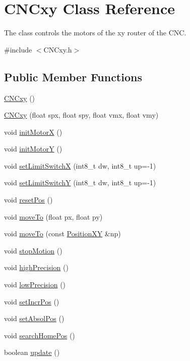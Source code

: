 \hypertarget{class_c_n_cxy}{\section{C\+N\+Cxy Class Reference}
\label{class_c_n_cxy}
}


The class controls the motors of the xy router of the C\+N\+C.  




{\ttfamily \#include $<$C\+N\+Cxy.\+h$>$}

\subsection*{Public Member Functions}
\begin{DoxyCompactItemize}
\item 
\hyperlink{class_c_n_cxy_a00b982f5e1cdf7d14e2b812fe634381a}{C\+N\+Cxy} ()
\item 
\hyperlink{class_c_n_cxy_adf2aa57e924162dcd02728eca3ce6ad4}{C\+N\+Cxy} (float spx, float spy, float vmx, float vmy)
\item 
void \hyperlink{class_c_n_cxy_a385a87e56ea216c855b4d2df37da987b}{init\+Motor\+X} ()
\item 
void \hyperlink{class_c_n_cxy_ab580bbe83bb4af2e9cfceb7409804a5f}{init\+Motor\+Y} ()
\item 
void \hyperlink{class_c_n_cxy_a32366595a9f719290e51bced4c50aef5}{set\+Limit\+Switch\+X} (int8\+\_\+t dw, int8\+\_\+t up=-\/1)
\item 
void \hyperlink{class_c_n_cxy_a0cb32c93e873b72091d8fadd8d6f00ca}{set\+Limit\+Switch\+Y} (int8\+\_\+t dw, int8\+\_\+t up=-\/1)
\item 
void \hyperlink{class_c_n_cxy_a2a0b5a7d65b3391a8e7e372aea2f670b}{reset\+Pos} ()
\item 
void \hyperlink{class_c_n_cxy_aeb30f9045a768b51b12521d032410631}{move\+To} (float px, float py)
\item 
void \hyperlink{class_c_n_cxy_a50739c5a639e2df4490725cb4893fe0d}{move\+To} (const \hyperlink{class_position_x_y}{Position\+X\+Y} \&np)
\item 
void \hyperlink{class_c_n_cxy_a1a20b3274b2cfcf28643ee50448d0406}{stop\+Motion} ()
\item 
void \hyperlink{class_c_n_cxy_a223b08f9efc7dc01cd43d2f5ddcf579e}{high\+Precision} ()
\item 
void \hyperlink{class_c_n_cxy_ad03042cf9aca863757e9fa17e216ca5c}{low\+Precision} ()
\item 
void \hyperlink{class_c_n_cxy_a8ce21ffa89d36b44eec760eadecf78d9}{set\+Incr\+Pos} ()
\item 
void \hyperlink{class_c_n_cxy_a61a22cacc98260960d4a4baf07fc9fb0}{set\+Absol\+Pos} ()
\item 
void \hyperlink{class_c_n_cxy_abe9aebdad9261020e38f2b0490fa5221}{search\+Home\+Pos} ()
\item 
boolean \hyperlink{class_c_n_cxy_ab30c0d98fe52c61abd63e1abb2ae1b69}{update} ()
\end{DoxyCompactItemize}
